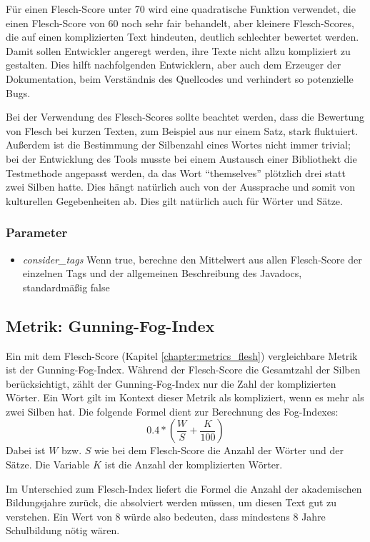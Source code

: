 Für einen Flesch-Score unter 70 wird eine quadratische Funktion verwendet, die einen Flesch-Score von 60 noch sehr fair behandelt, aber kleinere Flesch-Scores, die auf einen komplizierten Text hindeuten, deutlich schlechter bewertet werden. Damit sollen Entwickler angeregt werden, ihre Texte nicht allzu kompliziert zu gestalten. Dies hilft nachfolgenden Entwicklern, aber auch dem Erzeuger der Dokumentation, beim Verständnis des Quellcodes und verhindert so potenzielle Bugs.

Bei der Verwendung des Flesch-Scores sollte beachtet werden, dass die Bewertung von Flesch bei kurzen Texten, zum Beispiel aus nur einem Satz, stark fluktuiert. Außerdem ist die Bestimmung der Silbenzahl eines Wortes nicht immer trivial; bei der Entwicklung des Tools musste bei einem Austausch einer Bibliothekt die Testmethode angepasst werden, da das Wort \enquote{themselves} plötzlich drei statt zwei Silben hatte. Dies hängt natürlich auch von der Aussprache und somit von kulturellen Gegebenheiten ab. Dies gilt natürlich auch für Wörter und Sätze. 
\subsubsection{Parameter}
\begin{itemize}
    \item \textit{consider\_tags} Wenn true, berechne den Mittelwert aus allen Flesch-Score der einzelnen Tags und der allgemeinen Beschreibung des Javadocs, standardmäßig false
\end{itemize}

\subsection{Metrik: Gunning-Fog-Index}\label{chapter:metric_gunning_fog}
Ein mit dem Flesch-Score (Kapitel \ref{chapter:metrics_flesh}) vergleichbare Metrik ist der Gunning-Fog-Index. Während der Flesch-Score die Gesamtzahl der Silben berücksichtigt, zählt der Gunning-Fog-Index nur die Zahl der komplizierten Wörter. Ein Wort gilt im Kontext dieser Metrik als kompliziert, wenn es mehr als zwei Silben hat. Die folgende Formel dient zur Berechnung des Fog-Indexes:
\begin{equation}
    0.4*(\frac{W}{S}+\frac{K}{100})
\end{equation}
Dabei ist $W$ bzw. $S$ wie bei dem Flesch-Score die Anzahl der Wörter und der Sätze. Die Variable $K$ ist die Anzahl der komplizierten Wörter. 

Im Unterschied zum Flesch-Index liefert die Formel die Anzahl der akademischen Bildungsjahre zurück, die absolviert werden müssen, um diesen Text gut zu verstehen. Ein Wert von 8 würde also bedeuten, dass mindestens 8 Jahre Schulbildung nötig wären\cite[S. 24]{ThePrinciplesofReadability}. 


